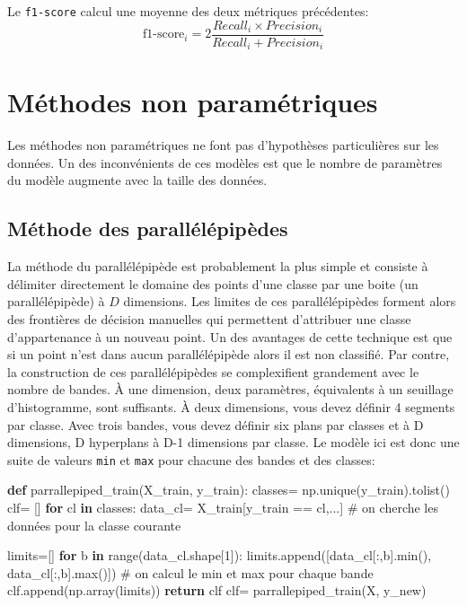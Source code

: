 \documentclass[
  11pt,
  letterpaper,
  open=any,
  twoside=false,
  french]{scrbook}
\newenvironment{Shaded}{\begin{snugshade}}{\end{snugshade}}
\newcommand{\BuiltInTok}[1]{\textcolor[rgb]{0.00,0.23,0.31}{#1}}
\newcommand{\CommentTok}[1]{\textcolor[rgb]{0.37,0.37,0.37}{#1}}
\newcommand{\ControlFlowTok}[1]{\textcolor[rgb]{0.00,0.23,0.31}{\textbf{#1}}}
\newcommand{\DecValTok}[1]{\textcolor[rgb]{0.68,0.00,0.00}{#1}}
\newcommand{\KeywordTok}[1]{\textcolor[rgb]{0.00,0.23,0.31}{\textbf{#1}}}
\newcommand{\NormalTok}[1]{\textcolor[rgb]{0.00,0.23,0.31}{#1}}
\newcommand{\OperatorTok}[1]{\textcolor[rgb]{0.37,0.37,0.37}{#1}}
\begin{document}
Le \texttt{f1-score} calcul une moyenne des deux métriques précédentes:
\[
\text{f1-score}_i=2\frac{Recall_i \times Precision_i}{Recall_i + Precision_i}
\]

\section{Méthodes non
paramétriques}\label{muxe9thodes-non-paramuxe9triques}

Les méthodes non paramétriques ne font pas d'hypothèses particulières
sur les données. Un des inconvénients de ces modèles est que le nombre
de paramètres du modèle augmente avec la taille des données.

\subsection{Méthode des parallélépipèdes}\label{sec-0511}

La méthode du parallélépipède est probablement la plus simple et
consiste à délimiter directement le domaine des points d'une classe par
une boite (un parallélépipède) à \(D\) dimensions. Les limites de ces
parallélépipèdes forment alors des frontières de décision manuelles qui
permettent d'attribuer une classe d'appartenance à un nouveau point. Un
des avantages de cette technique est que si un point n'est dans aucun
parallélépipède alors il est non classifié. Par contre, la construction
de ces parallélépipèdes se complexifient grandement avec le nombre de
bandes. À une dimension, deux paramètres, équivalents à un seuillage
d'histogramme, sont suffisants. À deux dimensions, vous devez définir 4
segments par classe. Avec trois bandes, vous devez définir six plans par
classes et à D dimensions, D hyperplans à D-1 dimensions par classe. Le
modèle ici est donc une suite de valeurs \texttt{min} et \texttt{max}
pour chacune des bandes et des classes:

\begin{Shaded}
\begin{Highlighting}[]
\KeywordTok{def}\NormalTok{ parrallepiped\_train(X\_train, y\_train):}
\NormalTok{  classes}\OperatorTok{=}\NormalTok{ np.unique(y\_train).tolist()}
\NormalTok{  clf}\OperatorTok{=}\NormalTok{ []}
  \ControlFlowTok{for}\NormalTok{ cl }\KeywordTok{in}\NormalTok{ classes:}
\NormalTok{      data\_cl}\OperatorTok{=}\NormalTok{ X\_train[y\_train }\OperatorTok{==}\NormalTok{ cl,...] }\CommentTok{\# on cherche les données pour la classe courante}
      
\NormalTok{      limits}\OperatorTok{=}\NormalTok{[]}
      \ControlFlowTok{for}\NormalTok{ b }\KeywordTok{in} \BuiltInTok{range}\NormalTok{(data\_cl.shape[}\DecValTok{1}\NormalTok{]):}
\NormalTok{        limits.append([data\_cl[:,b].}\BuiltInTok{min}\NormalTok{(), data\_cl[:,b].}\BuiltInTok{max}\NormalTok{()]) }\CommentTok{\# on calcul le min et max pour chaque bande}
\NormalTok{      clf.append(np.array(limits))}
  \ControlFlowTok{return}\NormalTok{ clf}
\NormalTok{clf}\OperatorTok{=}\NormalTok{ parrallepiped\_train(X, y\_new)}
\end{Highlighting}
\end{Shaded}
\end{document}
